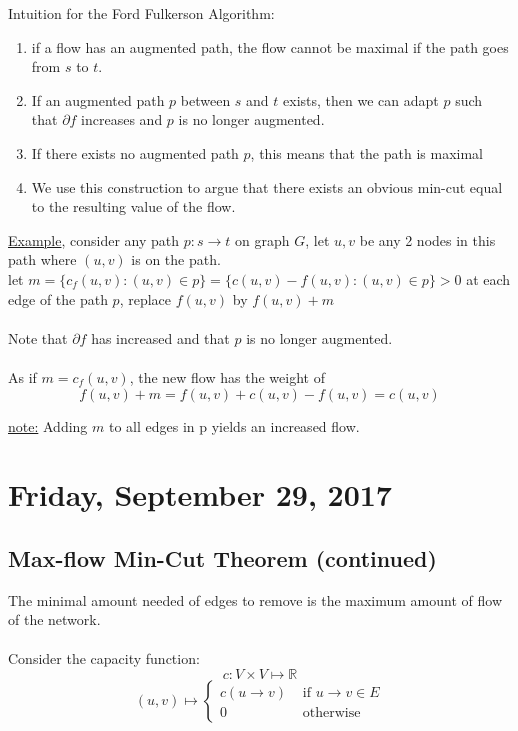 \documentclass[12pt]{article}
\begin{document}
Intuition for the Ford Fulkerson Algorithm:
\begin{enumerate}
	\item{if a flow has an augmented path, the flow cannot be maximal if the path goes from $s$ to $t$.}
	\item{If an augmented path $p$ between $s$ and $t$ exists, then we can adapt $p$ such that $\partial f$ increases and $p$ is no longer augmented.}
	\item{If there exists no augmented path $p$, this means that the path is maximal}
	\item{We use this construction to argue that there exists an obvious min-cut equal to the resulting value of the flow.}
\end{enumerate}

\underline{Example}, consider any path $p: s \rightarrow t$ on graph $G$, let $u,v$ be any 2 nodes in this path where $(u,v)$ is on the path.\\

let $m = \{ c_f (u,v) : (u,v) \in p \} = \{ c(u,v) - f(u,v) : (u,v) \in p \} > 0$ at each edge of the path $p$, replace $f(u,v)$ by $f(u,v) + m$\\
\\
Note that $\partial f$ has increased and that $p$ is no longer augmented.\\
\\
As if $m = c_f (u,v)$, the new flow has the weight of $$f(u,v) + m = f(u,v) + c(u,v) - f(u,v) = c(u,v)$$
\begin{tcolorbox}
	\underline{note:} Adding $m$ to all edges in p yields an increased flow.
\end{tcolorbox}

\newpage

\section{Friday, September 29, 2017}

\subsection{Max-flow Min-Cut Theorem (continued)}

The minimal amount needed of edges to remove is the maximum amount of flow of the network.\\
\\
Consider the capacity function: $$c: V \times V \mapsto \mathbb{R}$$
$$(u,v) \mapsto \begin{cases}
	c(u\rightarrow v) &\text{ if } u\rightarrow v \in E\\
	0 & \text{ otherwise}
\end{cases}$$
\end{document}
